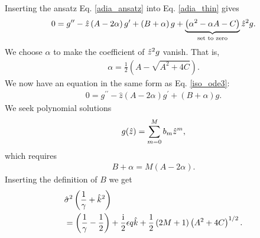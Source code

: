 Inserting the ansatz Eq. \ref{adia_ansatz} into Eq. \ref{adia_thin}
gives
\begin{align}
  0 = g^{\prime\prime} - \hat{z}\left(A - 2\alpha\right)g^\prime + \left(B +
      \alpha\right)g
    +\underbrace{\left(\alpha^2 - \alpha A - C\right)}_\text{set to zero}\hat{z}^2 g.
\end{align}
We choose $\alpha$ to make the coefficient of $\hat{z}^2g$ vanish. That
is,
\begin{align}
  \alpha = \frac{1}{2}\left(A - \sqrt{A^2 + 4C}\right).
\end{align} 
We now have an equation in the same form as Eq. \ref{iso_ode3}:
\begin{align}
  0 = g^{\prime\prime} - \hat{z}\left(A - 2\alpha\right)g^\prime +
  \left(B + \alpha\right)g.
\end{align}
We seek polynomial solutions 
\begin{align}
  g(\hat{z}) = \sum_{m=0}^M b_m \hat{z}^m,
\end{align}
which requires
\begin{align}
  B + \alpha = M\left(A-2\alpha\right).\label{adia_disp}
\end{align}
Inserting the definition of $B$ we get
\begin{align}
  &\hat{\sigma}^2\left(\frac{1}{\gamma}+\hat{k}^2\right) \notag\\ &=
  \left(\frac{1}{\gamma}-\frac{1}{2}\right) +\frac{\mathrm{i}}{2}\epsilon q
  \hat{k} + \frac{1}{2}\left(2M+1\right)\left(A^2 + 4C\right)^{1/2}. 
\end{align}

